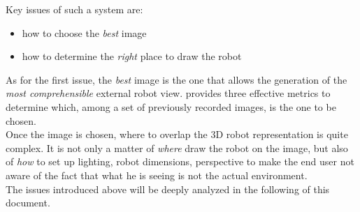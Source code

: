 Key issues of such a system are:

\begin{itemize}
\item how to choose the \textit{best} image
\item how to determine the \textit{right} place to draw the robot
\end{itemize}

As for the first issue, the \textit{best} image is the one that allows 
the generation of the \textit{most comprehensible} external robot view.
\cite{sugimoto} provides three effective metrics to 
determine which, among a set of previously recorded images, is the 
one to be chosen.
\\
Once the image is chosen, where to overlap the 3D robot representation 
is quite complex. It is not only a matter of \textit{where} draw the robot
on the image, but also of \textit{how} to set up lighting, robot dimensions,
perspective to make the end user not aware of the fact that what he is
seeing is not the actual environment.
\\
The issues introduced above will be deeply analyzed in the following 
of this document.
